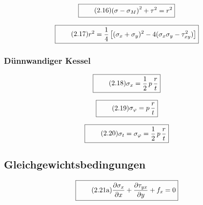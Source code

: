 \documentclass[11pt]{article}
\newcommand{\1}{ {\mathds{1}} }
\begin{document}
		\begin{equation}
			\boxed{
				\tag{2.16}
				\begin{split}
					\left(\sigma - \sigma_M\right)^2
					+
					\tau^2
					=
					r^2
				\end{split}
			}
		\end{equation}		

		\begin{equation}
			\boxed{
				\tag{2.17}
				\begin{split}
					r^2
					=
					\frac{1}{4}
					\left[
						(\sigma_x + \sigma_y)^2
						-
						4 (\sigma_x\sigma_y -\tau_{xy}^2)
					\right]
				\end{split}
			}
		\end{equation}		

		\subsubsection{Dünnwandiger Kessel}

		\begin{equation}
			\boxed{
				\tag{2.18}
				\begin{split}
					\sigma_x
					=
					\frac{1}{2} \,p\, \frac{r}{t}
				\end{split}
			}
		\end{equation}

		\begin{equation}
			\boxed{
				\tag{2.19}
				\begin{split}
					\sigma_{\varphi}
					=
					p\,
					\frac{r}{t}
				\end{split}
			}
		\end{equation}

		\begin{equation}
			\boxed{
				\tag{2.20}
				\begin{split}
					\sigma_t
					=
					\sigma_\varphi
					=
					\frac{1}{2}\,p\,\frac{r}{t}
				\end{split}
			}
		\end{equation}

		\subsection{Gleichgewichtsbedingungen}

		\begin{equation}
			\boxed{
				\tag{2.21a}
				\begin{split}
					\frac{\partial\sigma_x}{\partial x}
					+
					\frac{\partial\tau_{yx}}{\partial y}
					+
					f_x
					=
					0
				\end{split}
			}
		\end{equation}
\end{document}
